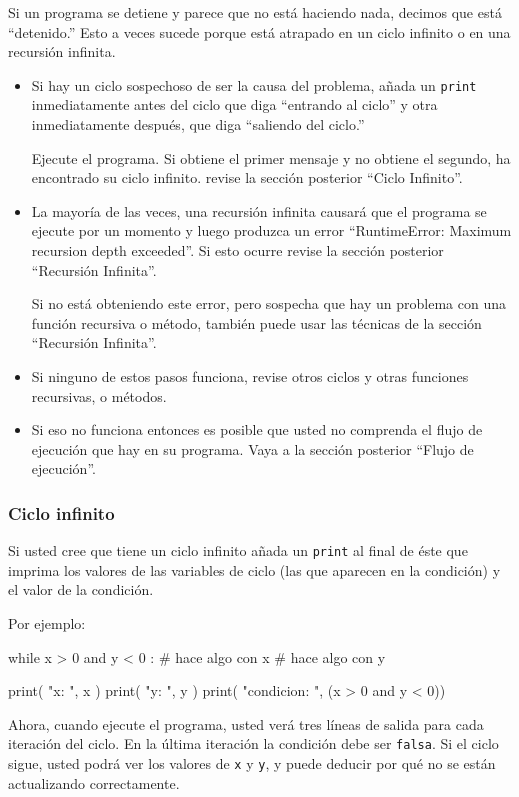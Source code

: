 Si un programa se detiene y parece que no está haciendo nada, decimos
que está ``detenido.'' Esto a veces sucede porque está atrapado
en un ciclo infinito o en una recursión infinita.
\begin{itemize}
\item Si hay un ciclo sospechoso de ser la causa del problema, añada un
\texttt{print} inmediatamente antes del ciclo que diga ``entrando
al ciclo'' y otra inmediatamente después, que diga ``saliendo del
ciclo.''

Ejecute el programa. Si obtiene el primer mensaje y no obtiene el
segundo, ha encontrado su ciclo infinito. revise la sección posterior
``Ciclo Infinito''.
\item La mayoría de las veces, una recursión infinita causará que el programa
se ejecute por un momento y luego produzca un error ``RuntimeError:
Maximum recursion depth exceeded''. Si esto ocurre revise la sección
posterior ``Recursión Infinita''.

Si no está obteniendo este error, pero sospecha que hay un problema
con una función recursiva o método, también puede usar las técnicas
de la sección ``Recursión Infinita''.
\item Si ninguno de estos pasos funciona, revise otros ciclos y otras funciones
recursivas, o métodos.
\item Si eso no funciona entonces es posible que usted no comprenda el flujo
de ejecución que hay en su programa. Vaya a la sección posterior ``Flujo
de ejecución''.
\end{itemize}

\subsubsection{Ciclo infinito}

  

Si usted cree que tiene un ciclo infinito añada un \texttt{print}
al final de éste que imprima los valores de las variables de ciclo
(las que aparecen en la condición) y el valor de la condición.

Por ejemplo:
\begin{pythoncode}
while x > 0 and y < 0 :
  # hace algo con x
  # hace algo con y

  print( "x: ", x )
  print( "y: ", y )
  print( "condicion: ", (x > 0 and y < 0))
\end{pythoncode}
 Ahora, cuando ejecute el programa, usted verá tres líneas de salida
para cada iteración del ciclo. En la última iteración la condición
debe ser \texttt{falsa}. Si el ciclo sigue, usted podrá ver los valores
de \texttt{x} y \texttt{y}, y puede deducir por qué no se están actualizando
correctamente.

